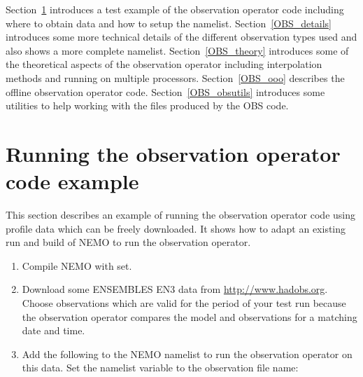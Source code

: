 \documentclass[NEMO_book]{subfiles}
\begin{document}
Section~\ref{OBS_example} introduces a test example of the observation operator code including
where to obtain data and how to setup the namelist. Section~\ref{OBS_details} introduces some
more technical details of the different observation types used and also shows a more complete
namelist. Section~\ref{OBS_theory} introduces some of the theoretical aspects of the observation
operator including interpolation methods and running on multiple processors.
Section~\ref{OBS_ooo} describes the offline observation operator code.
Section~\ref{OBS_obsutils} introduces some utilities to help working with the files
produced by the OBS code.

\section{Running the observation operator code example}
\label{OBS_example}

This section describes an example of running the observation operator code using
profile data which can be freely downloaded. It shows how to adapt an
existing run and build of NEMO to run the observation operator.

\begin{enumerate}
\item Compile NEMO with  set.

\item Download some ENSEMBLES EN3 data from 
\href{http://www.hadobs.org}{http://www.hadobs.org}. Choose observations which are
valid for the period of your test run because the observation operator compares
the model and observations for a matching date and time. 

\item Add the following to the NEMO namelist to run the observation
operator on this data. Set the  namelist variable to the
observation  file name:
\end{enumerate}

\end{document}
